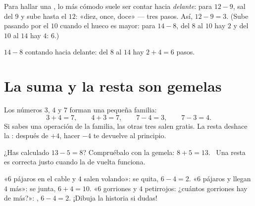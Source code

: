 \begin{method}\label{met:g1:subtraction:countup}
Para hallar una , lo más cómodo suele ser contar hacia \emph{delante}:
para $12 - 9$, sal del $9$ y sube hasta el $12$: «diez, once,
doce» --- tres pasos. Así, $12 - 9 = 3$. (Sube pasando por el $10$ cuando
el hueco es mayor: para $14 - 8$, del $8$ al $10$ hay $2$ y del $10$ al $14$
hay $4$:  $6$.)
\end{method}

\begin{omfigure}

{\small $14 - 8$ contando hacia delante: del $8$ al $14$ hay
$2 + 4 = 6$ pasos.}
\end{omfigure}

\section{La suma y la resta son gemelas}

\begin{example}\label{ex:g1:subtraction:family}
Los números $3$, $4$ y $7$ forman una pequeña familia:
\[
3 + 4 = 7, \qquad
4 + 3 = 7, \qquad
7 - 4 = 3, \qquad
7 - 3 = 4 .
\]
Si sabes una operación de la familia, las otras tres salen gratis.
La resta deshace la : después de $+4$, hacer $-4$ te devuelve al principio.
\end{example}

\begin{example}[Comprobar]\label{ex:g1:subtraction:check}
¿Has calculado $13 - 5 = 8$? Compruébalo con la  gemela:
$8 + 5 = 13$. \checkmark\ Una resta es correcta justo cuando la 
de vuelta funciona.
\end{example}

\begin{example}\label{ex:g1:subtraction:choose}
«$6$ pájaros en el cable y $4$ salen volando»: se quita, $6 - 4 = 2$.
«$6$ pájaros y llegan $4$ más»: se junta, $6 + 4 = 10$.
«$6$ gorriones y $4$ petirrojos: ¿cuántos gorriones hay de más?»:
, $6 - 4 = 2$. ¡Dibuja la historia si dudas!
\end{example}

